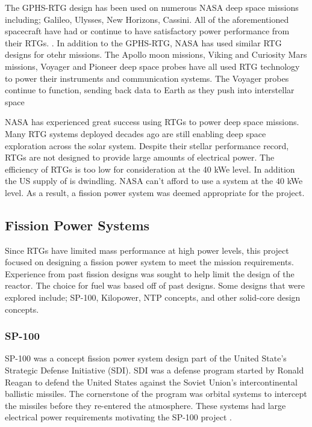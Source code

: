 The GPHS-RTG design has been used on
numerous NASA deep space missions including; Galileo, Ulysses, New Horizons,
Cassini. All of the aforementioned spacecraft have had or continue to have
satisfactory power performance from their RTGs. \citep{bennett_mission_2006}.
In addition to the GPHS-RTG, NASA has used similar RTG designs for otehr
missions. The Apollo moon missions, Viking and Curiosity Mars missions, Voyager
and Pioneer deep space probes have all used RTG technology to power their
instruments and communication systems. The Voyager probes continue to function,
sending back data to Earth as they push into interstellar space
\citep{mmrtg_fact}  

NASA has experienced great success using RTGs to power deep space missions. Many
RTG systems deployed decades ago are still enabling deep space exploration
across the solar system. Despite their stellar performance record, RTGs are not
designed to provide large amounts of electrical power. The efficiency of RTGs is
too low for consideration at the 40 kWe level. In addition the US supply of \pu
is dwindling. NASA can't afford to use a \pu system at the 40 kWe level. As a
result, a fission power system was deemed appropriate for the project.

\subsection{Fission Power Systems}
Since RTGs have limited mass performance at high power levels, this project focused on designing a
fission power system to meet the mission requirements. Experience from past
fission designs was sought to help limit the design of the reactor. The choice
for fuel was based off of past designs. Some designs that were explored include;
SP-100, Kilopower, NTP concepts, and other solid-core design concepts.
    
\subsubsection{SP-100}
    SP-100 was a concept fission power system design part of the United State's
    Strategic Defense Initiative (SDI). SDI was a defense program started by
    Ronald Reagan to defend the United States against the Soviet Union's intercontinental
    ballistic missiles. The cornerstone of the program was orbital systems to
    intercept the missiles before they re-entered the atmosphere. These systems
    had large electrical power requirements motivating the SP-100 project
    \citep{sp100}.

